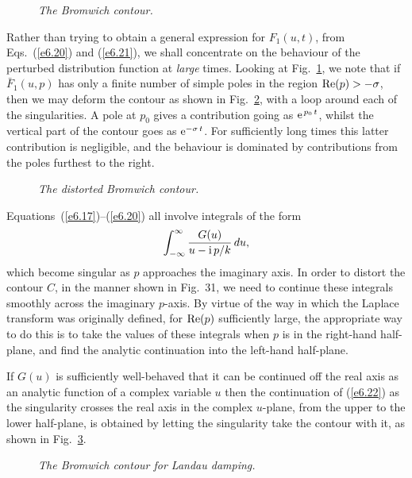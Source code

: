 \begin{figure}
\epsfysize=3in
\centerline{}
\caption{\em The Bromwich contour.}\label{f30}
\end{figure}

Rather than trying to obtain a general expression for $F_1(u,t)$, from
Eqs.~(\ref{e6.20}) and (\ref{e6.21}), we shall concentrate on the behaviour of the
perturbed distribution function at {\em large}\/ times. Looking at
Fig.~\ref{f30}, we note that if $\bar{F}_1(u,p)$ has only a finite
number of simple poles in the region ${\rm Re}(p)>-\sigma$, then
we may deform the contour as shown in Fig.~\ref{f31}, with a loop around
each of the singularities. A pole at $p_0$ gives a contribution
going as ${\rm e}^{\,p_0\,t}$, whilst the vertical part of the
contour goes as ${\rm e}^{-\sigma\,t}$. For sufficiently long times
this latter contribution is negligible, and the behaviour is
dominated by contributions from the poles furthest to the right.

\begin{figure}
\epsfysize=3in
\centerline{}
\caption{\em The distorted Bromwich contour.}\label{f31}
\end{figure}

Equations~(\ref{e6.17})--(\ref{e6.20}) all involve integrals of the form
\begin{equation}\label{e6.22}
\int_{-\infty}^\infty \frac{G(u)}{u-{\rm i}\,p/k}\,du,
\end{equation}
which become singular as $p$ approaches the imaginary axis. In order to
distort the contour $C$, in the manner shown in Fig.~31, we need to continue
these integrals smoothly across the imaginary $p$-axis. By virtue of the
way in which the Laplace transform was originally defined, for ${\rm Re}(p)$
sufficiently large, the appropriate way to do this is to take the values
of these integrals when $p$ is in the right-hand half-plane, and find the
analytic continuation into the left-hand half-plane.

If $G(u)$ is sufficiently well-behaved that it can be continued off the
real axis as an analytic function of a complex variable $u$ then the
continuation of (\ref{e6.22}) as the singularity crosses the real axis
in the complex $u$-plane, from the upper to the lower half-plane, is obtained
by letting the singularity take the contour with it, as shown
in Fig.~\ref{f32}.

\begin{figure}
\epsfysize=2.5in
\centerline{}
\caption{\em The Bromwich contour for Landau damping.}\label{f32}
\end{figure}

